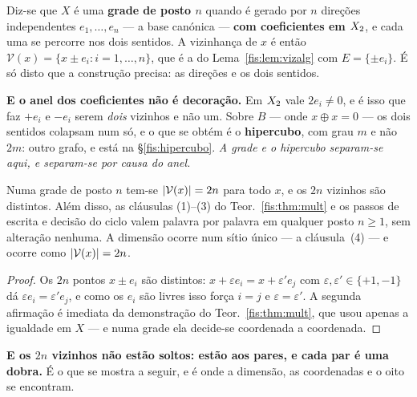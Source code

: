 \documentclass[livro.tex]{subfiles}
\begin{document}
\begin{definicao}\label{fis:def:grade}
Diz-se que $X$ é uma \textbf{grade de posto $n$} quando é gerado por $n$ direções
independentes $e_1,\dots,e_n$ --- a base canónica --- \textbf{com coeficientes em
$X_2$}, e cada uma se percorre nos dois sentidos. A vizinhança de $x$ é então
$\mathcal{V}(x)=\{x\pm e_i : i=1,\dots,n\}$, que é a do
Lema~\ref{fis:lem:vizalg} com $E=\{\pm e_i\}$. É só disto que a construção
precisa: as direções e os dois sentidos.

\medskip\noindent\textbf{E o anel dos coeficientes não é decoração.} Em $X_2$
vale $2e_i\neq0$, e é isso que faz $+e_i$ e $-e_i$ serem \emph{dois} vizinhos e
não um. Sobre $B$ --- onde $x\oplus x=0$ --- os dois sentidos colapsam num só, e
o que se obtém é o \textbf{hipercubo}, com grau $m$ e não $2m$: outro grafo, e
está na §\ref{fis:hipercubo}. \emph{A grade e o hipercubo separam-se aqui, e
separam-se por causa do anel.}
\end{definicao}

\begin{teorema}\label{fis:thm:dim}
Numa grade de posto $n$ tem-se $\lvert \mathcal{V}(x)\rvert=2n$ para todo $x$, e os $2n$
vizinhos são distintos. Além disso, as cláusulas (1)--(3) do
Teor.~\ref{fis:thm:mult} e os passos de escrita e decisão do ciclo valem palavra
por palavra em qualquer posto $n\ge1$, sem alteração nenhuma. A dimensão ocorre
num sítio único --- a cláusula~(4) --- e ocorre como $\lvert \mathcal{V}(x)\rvert=2n$.
\end{teorema}

\begin{proof}
Os $2n$ pontos $x\pm e_i$ são distintos: $x+\varepsilon e_i=x+\varepsilon'e_j$
com $\varepsilon,\varepsilon'\in\{+1,-1\}$ dá $\varepsilon e_i=\varepsilon'e_j$,
e como os $e_i$ são livres isso força $i=j$ e $\varepsilon=\varepsilon'$. A
segunda afirmação é imediata da demonstração do Teor.~\ref{fis:thm:mult}, que
usou apenas a igualdade em $X$ --- e numa grade ela decide-se coordenada a
coordenada.
\end{proof}

\medskip\noindent\textbf{E os $2n$ vizinhos não estão soltos: estão aos pares, e
cada par é uma dobra.} É o que se mostra a seguir, e é onde a dimensão, as
coordenadas e o oito se encontram.
\end{document}
